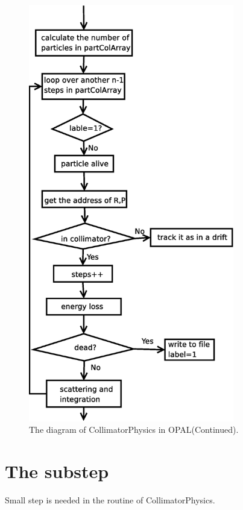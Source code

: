 \documentclass{article}
\begin{document}
\begin{figure}[H]
\begin{center}
\includegraphics*[width=0.8\textwidth]{Diagram2}
\end{center}
\caption{The diagram of CollimatorPhysics in OPAL(Continued). }
\label{fig:diagram2}
\end{figure}

\section{The substep}

Small step is needed in the routine of CollimatorPhysics. 
\end{document}
